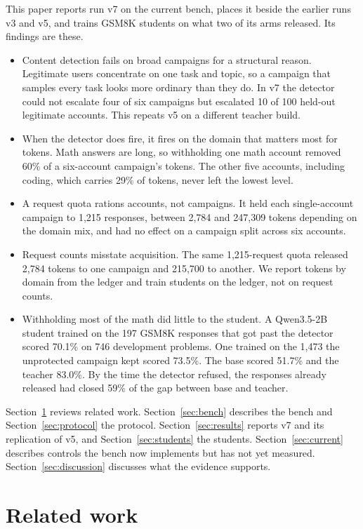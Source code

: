 \documentclass[journal]{IEEEtran}
\begin{document}
This paper reports run v7 on the current bench, places it beside the earlier runs v3 and v5, and trains GSM8K students on what two of its arms released. Its findings are these.
\begin{itemize}
	\item Content detection fails on broad campaigns for a structural reason. Legitimate users concentrate on one task and topic, so a campaign that samples every task looks more ordinary than they do. In v7 the detector could not escalate four of six campaigns but escalated 10 of 100 held-out legitimate accounts. This repeats v5 on a different teacher build.
	\item When the detector does fire, it fires on the domain that matters most for tokens. Math answers are long, so withholding one math account removed 60\% of a six-account campaign's tokens. The other five accounts, including coding, which carries 29\% of tokens, never left the lowest level.
	\item A request quota rations accounts, not campaigns. It held each single-account campaign to 1,215 responses, between 2,784 and 247,309 tokens depending on the domain mix, and had no effect on a campaign split across six accounts.
	\item Request counts misstate acquisition. The same 1,215-request quota released 2,784 tokens to one campaign and 215,700 to another. We report tokens by domain from the ledger and train students on the ledger, not on request counts.
	\item Withholding most of the math did little to the student. A Qwen3.5-2B student trained on the 197 GSM8K responses that got past the detector scored 70.1\% on 746 development problems. One trained on the 1,473 the unprotected campaign kept scored 73.5\%. The base scored 51.7\% and the teacher 83.0\%. By the time the detector refused, the responses already released had closed 59\% of the gap between base and teacher.
\end{itemize}

Section~\ref{sec:related} reviews related work. Section~\ref{sec:bench} describes the bench and Section~\ref{sec:protocol} the protocol. Section~\ref{sec:results} reports v7 and its replication of v5, and Section~\ref{sec:students} the students. Section~\ref{sec:current} describes controls the bench now implements but has not yet measured. Section~\ref{sec:discussion} discusses what the evidence supports.

\section{Related work}
\label{sec:related}
\end{document}
